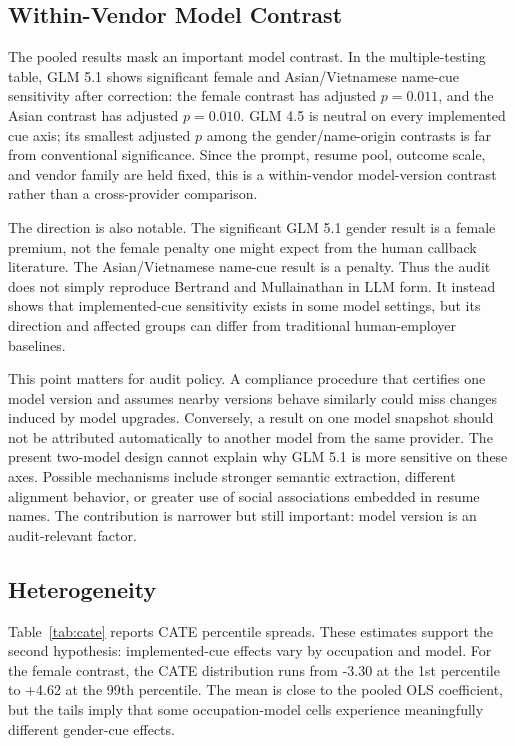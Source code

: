 \documentclass[10pt,twocolumn,letterpaper]{article}
\begin{document}
\subsection{Within-Vendor Model Contrast}

The pooled results mask an important model contrast. In the multiple-testing table, GLM 5.1 shows significant female and Asian/Vietnamese name-cue sensitivity after correction: the female contrast has adjusted $p=0.011$, and the Asian contrast has adjusted $p=0.010$. GLM 4.5 is neutral on every implemented cue axis; its smallest adjusted $p$ among the gender/name-origin contrasts is far from conventional significance. Since the prompt, resume pool, outcome scale, and vendor family are held fixed, this is a within-vendor model-version contrast rather than a cross-provider comparison.

The direction is also notable. The significant GLM 5.1 gender result is a female premium, not the female penalty one might expect from the human callback literature. The Asian/Vietnamese name-cue result is a penalty. Thus the audit does not simply reproduce Bertrand and Mullainathan in LLM form. It instead shows that implemented-cue sensitivity exists in some model settings, but its direction and affected groups can differ from traditional human-employer baselines.

This point matters for audit policy. A compliance procedure that certifies one model version and assumes nearby versions behave similarly could miss changes induced by model upgrades. Conversely, a result on one model snapshot should not be attributed automatically to another model from the same provider. The present two-model design cannot explain why GLM 5.1 is more sensitive on these axes. Possible mechanisms include stronger semantic extraction, different alignment behavior, or greater use of social associations embedded in resume names. The contribution is narrower but still important: model version is an audit-relevant factor.

\subsection{Heterogeneity}

Table~\ref{tab:cate} reports CATE percentile spreads. These estimates support the second hypothesis: implemented-cue effects vary by occupation and model. For the female contrast, the CATE distribution runs from -3.30 at the 1st percentile to +4.62 at the 99th percentile. The mean is close to the pooled OLS coefficient, but the tails imply that some occupation-model cells experience meaningfully different gender-cue effects.
\end{document}
